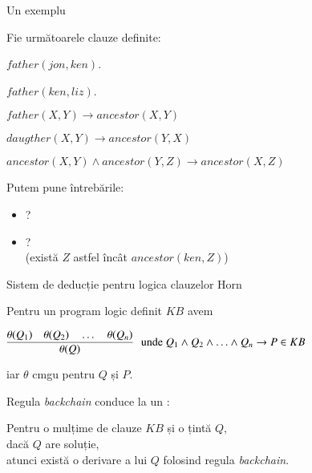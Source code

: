 \documentclass[xcolor=pdftex,romanian,colorlinks]{beamer}
\begin{document}
\begin{frame}{Un exemplu}

Fie următoarele clauze definite:

\hspace{.4cm} $father(jon,ken)$.

\hspace{.4cm} $father(ken,liz)$.

\hspace{.4cm} $father(X,Y) \to ancestor(X,Y)$

\hspace{.4cm} $daugther(X,Y) \to ancestor(Y,X)$ 

\hspace{.4cm} $ancestor(X,Y) \wedge ancestor(Y,Z) \to ancestor(X,Z)$

\medskip
Putem pune întrebările:
\begin{itemize}
  \item {}?
  \item {}? \\(există $Z$ astfel încât $ancestor(ken,Z)$) 
\end{itemize}

\end{frame}

\begin{frame}{Sistem de deducție pentru logica clauzelor Horn}


Pentru un program logic definit $KB$  avem 

\vfill  
\hfill \(\displaystyle
  \infer[\mbox{ unde }Q_1 \wedge Q_2 \wedge \ldots \wedge Q_n \to P \in KB]{\theta(Q)}{\theta(Q_1)\quad \theta(Q_2) \quad \ldots \quad \theta(Q_n)}
  \)\vspace{-1.5ex}

  \hfill iar $\theta$ cmgu pentru $Q$ și $P$.

  \vfill
\vspace{.4cm}
Regula \textit{backchain} conduce la un :
\begin{center}
  
  Pentru o mulțime de clauze $KB$ și o țintă $Q$, \\
  dacă $Q$ are soluție, \\
  atunci există o derivare a lui $Q$ folosind regula \textit{backchain}.
\end{center} 
\end{frame}
\end{document}
